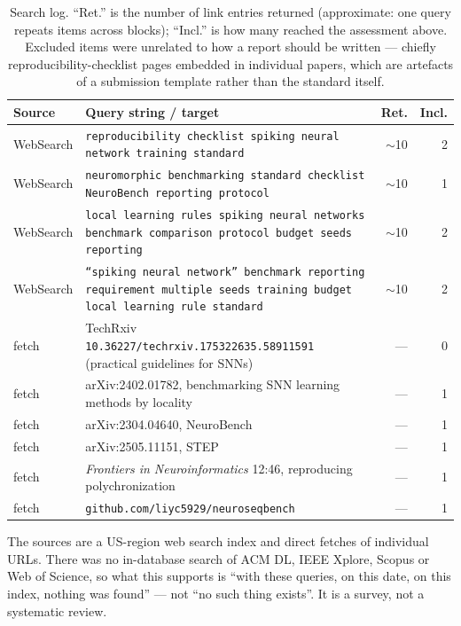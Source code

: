 \documentclass[11pt]{article}
\begin{document}
\begin{table}[h]
\centering
\small
\begin{tabular}{@{}p{}p{}rr@{}}
\toprule
Source & Query string / target & Ret. & Incl. \\
\midrule
WebSearch & \texttt{reproducibility checklist spiking neural network training standard} & $\sim$10 & 2 \\
WebSearch & \texttt{neuromorphic benchmarking standard checklist NeuroBench reporting protocol} & $\sim$10 & 1 \\
WebSearch & \texttt{local learning rules spiking neural networks benchmark comparison protocol budget seeds reporting} & $\sim$10 & 2 \\
WebSearch & \texttt{``spiking neural network'' benchmark reporting requirement multiple seeds training budget local learning rule standard} & $\sim$10 & 2 \\
fetch & TechRxiv \texttt{10.36227/techrxiv.175322635.58911591} (practical guidelines for SNNs) & --- & 0 \\
fetch & arXiv:2402.01782, benchmarking SNN learning methods by locality & --- & 1 \\
fetch & arXiv:2304.04640, NeuroBench & --- & 1 \\
fetch & arXiv:2505.11151, STEP & --- & 1 \\
fetch & \textit{Frontiers in Neuroinformatics} 12:46, reproducing polychronization & --- & 1 \\
fetch & \texttt{github.com/liyc5929/neuroseqbench} & --- & 1 \\
\bottomrule
\end{tabular}
\caption{Search log. ``Ret.'' is the number of link entries returned (approximate:
one query repeats items across blocks); ``Incl.'' is how many reached the
assessment above. Excluded items were unrelated to how a report should be written
--- chiefly reproducibility-checklist pages embedded in individual papers, which
are artefacts of a submission template rather than the standard itself.}
\end{table}

The sources are a US-region web search index and direct fetches of individual
URLs. There was no in-database search of ACM DL, IEEE Xplore, Scopus or Web of
Science, so what this supports is ``with these queries, on this date, on this
index, nothing was found'' --- not ``no such thing exists''. It is a survey, not a
systematic review.
\end{document}
